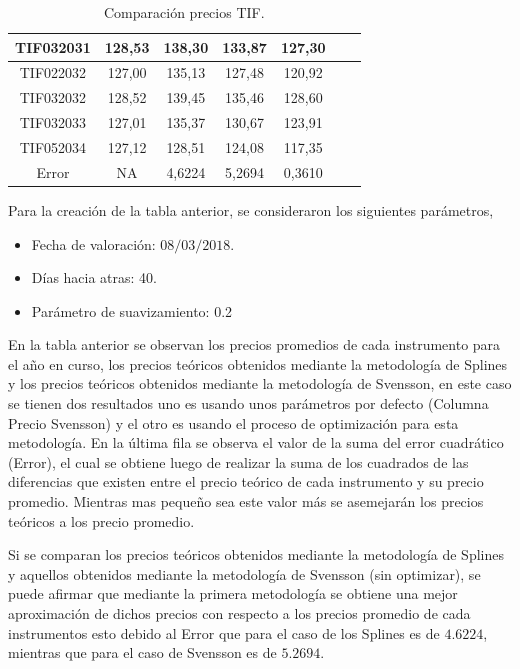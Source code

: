 \begin{table}[H]
{\begin{tabular}[t]{|c |c |c |c |c |c |r|}
\hline
TIF032031 & 128,53 & 138,30 & 133,87 & 127,30  \\
\hline
TIF022032 & 127,00 & 135,13 & 127,48 & 120,92\\
\hline
TIF032032 & 128,52 & 139,45 & 135,46 & 128,60  \\
\hline
TIF032033 & 127,01& 135,37 & 130,67 & 123,91\\
\hline
TIF052034 & 127,12 & 128,51 & 124,08 & 117,35\\
\hline
Error & NA & 4,6224 & 5,2694 & 0,3610\\
\hline
\end{tabular}}
\caption{Comparaci\'on precios TIF.}
\label{tabla2}
\end{table}


\hspace{0.4cm} Para la creaci\'on de la tabla anterior, se consideraron los siguientes par\'ametros,

\begin{itemize}
  \item Fecha de valoraci\'on: $08/03/2018$.
  \item D\'ias hacia atras: 40.
  \item Par\'ametro de suavizamiento: 0.2
\end{itemize}


\hspace{0.4cm} En la tabla anterior se observan los precios promedios de cada instrumento para el a\~no en curso, los precios te\'oricos obtenidos mediante la metodolog\'ia de Splines y los precios te\'oricos obtenidos mediante la metodolog\'ia de Svensson, en este caso se tienen dos resultados uno es usando unos par\'ametros por defecto (Columna Precio Svensson) y el otro es usando el proceso de optimizaci\'on para esta metodolog\'ia. En la \'ultima fila se observa el valor de la suma del error cuadr\'atico (Error), el cual se obtiene luego de realizar la suma de los cuadrados de las diferencias que existen entre el precio te\'orico de cada instrumento y su precio promedio. Mientras mas peque\~no sea este valor m\'as se asemejar\'an los precios te\'oricos a los precio promedio.

\hspace{0.4cm} Si se comparan los precios te\'oricos obtenidos mediante la metodolog\'ia de Splines y aquellos obtenidos mediante la metodolog\'ia de Svensson (sin optimizar), se puede afirmar que mediante la primera metodolog\'ia se obtiene una mejor aproximaci\'on de dichos precios con respecto a los precios promedio de cada instrumentos esto debido al Error que para el caso de los Splines es de $4.6224$, mientras que para el caso de Svensson es de $5.2694$.

